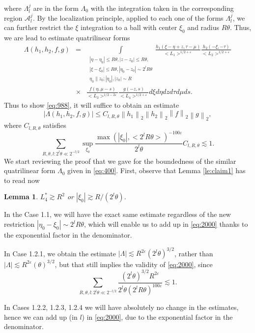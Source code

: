 \documentclass[draft,11pt,leqno]{amsart}
\newtheorem{lemma}{Lemma}
\newcommand{\norm}[2]{{\left\| #1 \right\|}_{#2}}
\newcommand{\ve}{\varepsilon}
\newcommand{\La}{\Lambda}
\newcommand{\ca}{\mathcal A}
\newcommand{\intl}{\int\limits}
\newcommand{\suml}{\sum\limits}
\newcommand{\supl}{\sup\limits}
\newcommand{\f}{\displaystyle\frac}
\newcommand{\lfour}{{L_4^{*}}}
\begin{document}
where $\La_l^j$ are in the form $\La_0$ with the integration taken in the corresponding region $\ca_l^j$. 
By the localization principle, applied to each one of the forms 
$\La_l^j$, we can further restrict the $\xi$ integration
to a ball with center $\xi_0$ and radius $R\theta$. Thus, we are lead to estimate quatrilinear forms 
\begin{eqnarray}
\label{eq:k1}
\La(h_1,h_2,f,g) &=&
\intl_{\begin{array}{l}
|\eta-\eta_0|\leq R\theta, |z-z_0|\leq R\theta, \\
|\xi-\xi_0|\leq R\theta, |\eta_0-z_0|\sim 2^l R\theta \\
\eta_0\|z_0; |\eta_0|, |z_0|\sim R
\end{array}}
\f{h_1(\xi-\eta+z,\tau-\mu)}{<L_1>^
{1/2+\ve}} \f{h_2(-\xi,-\tau)}{<L_2>^{1/2+\ve}}  \\
\nonumber
&\times& \f{f(\eta,\mu-s)}{<L_3>^{1/2-2\ve}}
\f{g(-z,s)}{<L_4>^{1/2+\ve}}
d\xi d\eta dz d\tau d\mu ds.
\end{eqnarray}
Thus to show \eqref{eq:988}, it will suffice to obtain an estimate
$$
|\La(h_1, h_2, f,g)|\leq C_{l,R, \theta}\norm{h_1}{2}\norm{h_2}{2}\norm{f}{2}\norm{g}{2},
$$
where $C_{l, R, \theta}$ satisfies
\begin{equation}
\label{eq:2000}
\suml_{R, \theta, l:2^l\theta\ll 2^{-l/2}} \supl_{\xi_0}\f{\max(|\xi_0|, <2^lR\theta>)^{-100\ve}}{2^{l}\theta}C_{l, R, \theta}\lesssim 1. 
\end{equation}
We start reviewing the proof that we gave for the boundedness of the similar
quatrilinear form $\La_0$ given in \eqref{eq:400}. First, observe 
that Lemma \ref{le:claim1} has to read now
\begin{lemma}
\label{le:claim2}
$\lfour\gtrsim R^2$ or $|\xi_0|\gtrsim R/(2^l\theta)$.
\end{lemma}
In the Case 1.1, we will have the exact same estimate regardless of
the new restriction $|\eta_0-\xi_0|\sim 2^l R\theta$, which will enable us
to add up in \eqref{eq:2000} thanks to the exponential factor in the
denominator.

In Case 1.2.1, we obtain the estimate $|\La|\lesssim R^{2\ve} (2^l\theta)^{3/2}$, rather than
$|\La|\lesssim R^{2\ve} (\theta)^{3/2}$, but that still implies the validity of \eqref{eq:2000}, since
$$
\suml_{R,\theta, l: 2^l \theta\ll 2^{-l/2}} 
\f{(2^l\theta)^{3/2}R^{2\ve}}{2^l\theta (2^lR\theta)^{100\ve}}\lesssim 1.
$$

In Cases 1.2.2, 1.2.3, 1.2.4 we will have absolutely no change in 
the estimates, hence we can add up (in $l$) in \eqref{eq:2000}, 
due to the exponential factor in the denominator.
\end{document}
